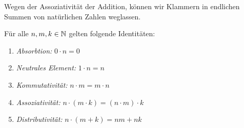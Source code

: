 \begin{remark}
    Wegen der Assoziativität der Addition, können wir Klammern in endlichen Summen von natürlichen Zahlen weglassen.
\end{remark}

\begin{lemma}
    Für alle $n,m,k\in\mathbb{N}$ gelten folgende Identitäten:
    \begin{enumerate}
        \item \textit{Absorbtion:} $0\cdot n=0$
        \item \textit{Neutrales Element:} $1\cdot n=n$
        \item \textit{Kommutativität:} $n\cdot m=m\cdot n$
        \item \textit{Assoziativität:} $n\cdot(m\cdot k)=(n\cdot m)\cdot k$
        \item \textit{Distributivität:} $n\cdot(m+k)=nm+nk$
    \end{enumerate}
\end{lemma}
